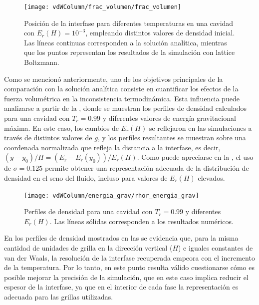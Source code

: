 \begin{figure}[ht]
	\centering
	\texttt{[image: vdWColumn/frac\_volumen/frac\_volumen]}
	\caption{Posici\'on de la interfase  para diferentes temperaturas en una cavidad con $E_r(H)=10^{-3}$, empleando distintos valores de densidad inicial. Las l\'ineas continuas corresponden a la soluci\'on anal\'itica, mientras que los puntos representan  los resultados de la simulaci\'on con lattice Boltzmann.}
	\label{fig:vdWColumn_frac_volumen}
\end{figure}

Como se mencion\'o anteriormente, uno de los objetivos principales de la comparaci\'on con la soluci\'on anal\'itica consiste en cuantificar los efectos de la fuerza volum\'etrica en la inconsistencia termodin\'amica. Esta influencia puede analizarse a partir de la , donde se muestran los perfiles de densidad calculados para una cavidad con $T_r=0.99$ y diferentes valores de energ\'ia gravitacional m\'axima. En este caso, los cambios de $E_r(H)$ se reflejaron en las simulaciones a trav\'es de distintos valores de $g$, y los perfiles resultantes se muestran sobre una coordenada normalizada que refleja la distancia a la interfase, es decir, $(y-y_0)/H = (E_r-E_r(y_0)) / E_r(H)$. Como puede apreciarse en la , el uso de $\sigma=0.125$ permite obtener una representaci\'on adecuada de la distribuci\'on de densidad en el seno del fluido, incluso para valores de $E_r(H)$ elevados.

\begin{figure}[ht]
	\centering
	\texttt{[image: vdWColumn/energia\_grav/rhor\_energia\_grav]}
	\caption{Perfiles de densidad para una cavidad con $T_r = 0.99$ y diferentes $E_r(H)$. Las l\'ineas s\'olidas corresponden a los resultados num\'ericos.}
	\label{fig:vdWColumn_rhor_egrav}
\end{figure}

En los perfiles de densidad mostrados en las  se evidencia que, para la misma cantidad de unidades de grilla en la direcci\'on vertical ($H$) e iguales constantes de van der Waals, la resoluci\'on de la interfase recuperada empeora con el incremento de la temperatura. Por lo tanto, en este punto resulta v\'alido cuestionarse c\'omo es posible mejorar la precisi\'on de la simulaci\'on, que en este caso implica reducir el espesor de la interfase, ya que en el interior de cada fase la representaci\'on es adecuada para las grillas utilizadas.

